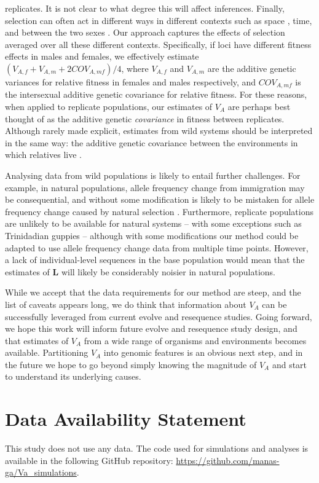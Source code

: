 \documentclass[12pt]{article}
\begin{document}
\begin{bibunit}
replicates. It is not clear to what degree this will affect inferences. Finally, selection can often act in different ways in different contexts such as space \citep{whitlock2015modern, delph2018study}, time, and between the two sexes \citep{schenkel2018making}. Our approach captures the effects of selection averaged over all these different contexts. Specifically, if loci have different fitness effects in males and females, we effectively estimate $(V_{A,f} + V_{A,m} + 2COV_{A,mf})/4$, where $V_{A,f}$ and $V_{A,m}$ are the additive genetic variances for relative fitness in females and males respectively, and $COV_{A,mf}$ is the intersexual additive genetic covariance for relative fitness. For these reasons, when applied to replicate populations, our estimates of $V_A$ are perhaps best thought of as the additive genetic \emph{covariance} in fitness between replicates. Although rarely made explicit, estimates from wild systems should be interpreted in the same way: the additive genetic covariance between the environments in which relatives live \citep{Vehvilainen.2008}.   

Analysing data from wild populations is likely to entail further challenges. For example, in natural populations, allele frequency change from immigration may be consequential, and without some modification is likely to be mistaken for allele frequency change caused by natural selection \citep{simon2024contribution}. Furthermore, replicate populations are unlikely to be available for natural systems -- with some exceptions such as Trinidadian guppies \citep{reznick1996life} -- although with some modifications our method could be adapted to use allele frequency change data from multiple time points. However, a lack of individual-level sequences in the base population would mean that the estimates of $\textbf{L}$ will likely be considerably noisier in natural populations. 

While we accept that the data requirements for our method are steep, and the list of caveats appears long, we do think that information about $V_A$ can be successfully leveraged from current evolve and resequence studies. Going forward, we hope this work will inform future evolve and resequence study design, and that estimates of $V_A$ from a wide range of organisms and environments becomes available. Partitioning $V_A$ into genomic features is an obvious next step, and in the future we hope to go beyond simply knowing the magnitude of $V_A$ and start to understand its underlying causes.

\section*{Data Availability Statement}
This study does not use any data. The code used for simulations and analyses is available in the following GitHub repository: \url{https://github.com/manas-ga/Va_simulations}.


\end{bibunit}
\end{document}
